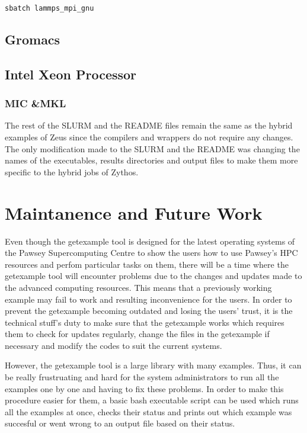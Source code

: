 \documentclass[journal]{IEEEtran}
\begin{document}
{\begin{verbatim}
sbatch lammps_mpi_gnu
\end{verbatim}

\subsection{Gromacs}





\subsection{Intel Xeon Processor}

\subsubsection{MIC &MKL}  

The rest of the SLURM and the README files remain the same as the hybrid examples of Zeus since the compilers and wrappers do not require any changes.
The only modification made to the SLURM and the README was changing the names of the executables, results directories and output files to make them more
specific to the hybrid jobs of Zythos. 

  
\section{Maintanence and Future Work}

Even though the getexample tool is designed for the latest operating systems of the Pawsey Supercomputing Centre to show the users how to use
Pawsey's HPC resources and perfom particular tasks on them, there will be a time where the getexample tool will encounter problems due 
to the changes and updates made to the advanced computing resources. This means that a previously working example may fail to work and resulting 
inconvenience for the users. In order to prevent the getexample becoming outdated and losing the users' trust, it is the technical stuff's 
duty to make sure that the getexample works which requires them to check for updates regularly, change the files in the getexample if necessary and 
modify the codes to suit the current systems.

However, the getexample tool is a large library with many examples. Thus, it can be really frustruating and hard for the system administrators to run 
all the examples one by one and having to fix these problems. In order to make this procedure easier for them, a basic bash executable script can be 
used which runs all the examples at once, checks their status and prints out which example was succesful or went wrong to an output file based on their
status.

}
\end{document}
